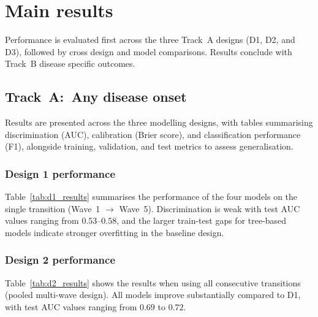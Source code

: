 \section{Main results}\label{sc:results}
Performance is evaluated first across the three Track~A designs (D1, D2, and D3), followed by cross design and model comparisons. Results conclude with Track~B disease specific outcomes.

\subsection{Track~A:\ Any disease onset}
Results are presented across the three modelling designs, with tables summarising discrimination (\gls{AUC}), calibration (Brier score), and classification performance (F1), alongside training, validation, and test metrics to assess generalisation.

\subsubsection{Design 1 performance}\label{ssc:d1}
Table~\ref{tab:d1_results} summarises the performance of the four models on the single transition (Wave~1 $\rightarrow$ Wave~5). Discrimination is weak with test \gls{AUC} values ranging from $0.53$--$0.58$, and the larger train-test gaps for tree-based models indicate stronger overfitting in the baseline design.

\begin{table}[ht]
\centering
\caption{Predictive performance across model families for D1 (baseline design).}\label{tab:d1_results}
\end{table}

\subsubsection{Design 2 performance}\label{ssc:d2}
Table~\ref{tab:d2_results} shows the results when using all consecutive transitions (pooled multi-wave design). All models improve substantially compared to D1, with test \gls{AUC} values ranging from $0.69$ to $0.72$.

